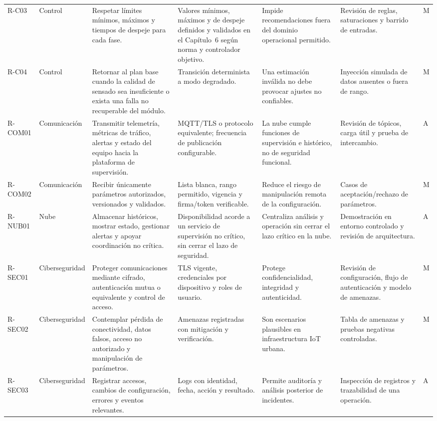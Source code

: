 \begin{landscape}
\begin{longtable}{@{}p{1.15cm}p{1.7cm}p{5.1cm}p{3.1cm}p{4.2cm}p{3.6cm}p{1.0cm}@{}}
R-C03 & Control & Respetar límites mínimos, máximos y tiempos de despeje para cada fase. & Valores mínimos, máximos y de despeje definidos y validados en el Capítulo~6 según norma y controlador objetivo. & Impide recomendaciones fuera del dominio operacional permitido. & Revisión de reglas, saturaciones y barrido de entradas. & M\\
R-C04 & Control & Retornar al plan base cuando la calidad de sensado sea insuficiente o exista una falla no recuperable del módulo. & Transición determinista a modo degradado. & Una estimación inválida no debe provocar ajustes no confiables. & Inyección simulada de datos ausentes o fuera de rango. & M\\
R-COM01 & Comunicación & Transmitir telemetría, métricas de tráfico, alertas y estado del equipo hacia la plataforma de supervisión. & MQTT/TLS o protocolo equivalente; frecuencia de publicación configurable. & La nube cumple funciones de supervisión e histórico, no de seguridad funcional. & Revisión de tópicos, carga útil y prueba de intercambio. & A\\
R-COM02 & Comunicación & Recibir únicamente parámetros autorizados, versionados y validados. & Lista blanca, rango permitido, vigencia y firma/token verificable. & Reduce el riesgo de manipulación remota de la configuración. & Casos de aceptación/rechazo de parámetros. & M\\
R-NUB01 & Nube & Almacenar históricos, mostrar estado, gestionar alertas y apoyar coordinación no crítica. & Disponibilidad acorde a un servicio de supervisión no crítico, sin cerrar el lazo de seguridad. & Centraliza análisis y operación sin cerrar el lazo crítico en la nube. & Demostración en entorno controlado y revisión de arquitectura. & A\\
R-SEC01 & Ciberseguridad & Proteger comunicaciones mediante cifrado, autenticación mutua o equivalente y control de acceso. & TLS vigente, credenciales por dispositivo y roles de usuario. & Protege confidencialidad, integridad y autenticidad. & Revisión de configuración, flujo de autenticación y modelo de amenazas. & M\\
R-SEC02 & Ciberseguridad & Contemplar pérdida de conectividad, datos falsos, acceso no autorizado y manipulación de parámetros. & Amenazas registradas con mitigación y verificación. & Son escenarios plausibles en infraestructura IoT urbana. & Tabla de amenazas y pruebas negativas controladas. & M\\
R-SEC03 & Ciberseguridad & Registrar accesos, cambios de configuración, errores y eventos relevantes. & Logs con identidad, fecha, acción y resultado. & Permite auditoría y análisis posterior de incidentes. & Inspección de registros y trazabilidad de una operación. & A\\

\end{longtable}
\end{landscape}
